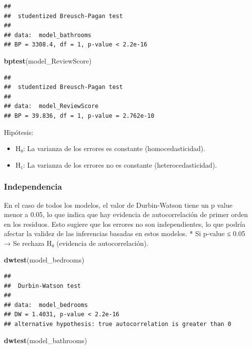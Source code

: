 \documentclass[
]{article}
\newenvironment{Shaded}{\begin{snugshade}}{\end{snugshade}}
\newcommand{\FunctionTok}[1]{\textcolor[rgb]{0.13,0.29,0.53}{\textbf{#1}}}
\newcommand{\NormalTok}[1]{#1}
\providecommand{\tightlist}{%
  \setlength{\itemsep}{0pt}\setlength{\parskip}{0pt}}
\begin{document}
\begin{verbatim}
## 
##  studentized Breusch-Pagan test
## 
## data:  model_bathrooms
## BP = 3308.4, df = 1, p-value < 2.2e-16
\end{verbatim}

\begin{Shaded}
\begin{Highlighting}[]
\FunctionTok{bptest}\NormalTok{(model\_ReviewScore)}
\end{Highlighting}
\end{Shaded}

\begin{verbatim}
## 
##  studentized Breusch-Pagan test
## 
## data:  model_ReviewScore
## BP = 39.836, df = 1, p-value = 2.762e-10
\end{verbatim}

Hipótesis:

\begin{itemize}
\tightlist
\item
  H₀: La varianza de los errores es constante (homocedasticidad).
\item
  H₁: La varianza de los errores no es constante (heterocedasticidad).
\end{itemize}

\subsubsection{Independencia}\label{independencia}

En el caso de todos los modelos, el valor de Durbin-Watson tiene un p
value menor a 0.05, lo que indica que hay evidencia de autocorrelación
de primer orden en los residuos. Esto sugiere que los errores no son
independientes, lo que podría afectar la validez de las inferencias
basadas en estos modelos. * Si p-value ≤ 0.05 → Se rechaza H₀ (evidencia
de autocorrelación).

\begin{Shaded}
\begin{Highlighting}[]
\FunctionTok{dwtest}\NormalTok{(model\_bedrooms)}
\end{Highlighting}
\end{Shaded}

\begin{verbatim}
## 
##  Durbin-Watson test
## 
## data:  model_bedrooms
## DW = 1.4031, p-value < 2.2e-16
## alternative hypothesis: true autocorrelation is greater than 0
\end{verbatim}

\begin{Shaded}
\begin{Highlighting}[]
\FunctionTok{dwtest}\NormalTok{(model\_bathrooms)}
\end{Highlighting}
\end{Shaded}
\end{document}
